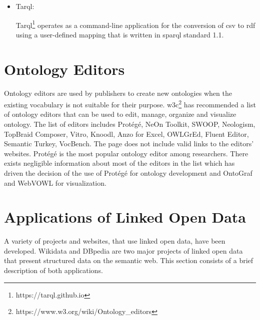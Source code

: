 \begin{doublespace}
\begin{itemize}
    \par XLWrap\footnote{https://xlwrap.sourceforge.io} is a graphical template based application that allows execution of various \ac{sparql} queries~\cite{andreas2009xlwrap}.  The spreadsheets are wrapped to arbitrary \ac{rdf} graphs which allows:
    \begin{itemize}
    	\item Streamed processing of tabluar data like Excel, OpenDocument and \ac{csv}
	\item Loading Local/\ac{http}
	\item Expressions that include calculator operations for Excel and OpenDocument, and Custom functions
	\item Use of \ac{api} and \ac{sparql} endpoint
    \end{itemize}
    \item Tarql:
    \par Tarql\footnote{https://tarql.github.io} operates as a command-line application for the conversion of \ac{csv} to \ac{rdf} using a user-defined mapping that is written in \ac{sparql} standard 1.1.
\end{itemize}
\section{Ontology Editors}
\par Ontology editors are used by publishers to create new ontologies when the existing vocabulary is not suitable for their purpose. \ac{w3c}\footnote{https://www.w3.org/wiki/Ontology\_editors} has recommended a list of ontology editors that can be used to edit, manage, organize and visualize ontology. The list of editors includes Protégé, NeOn Toolkit, SWOOP, Neologism, TopBraid Composer, Vitro, Knoodl, Anzo for Excel, OWLGrEd, Fluent Editor, Semantic Turkey, VocBench. The page does not include valid links to the editors' websites. Protégé is the most popular ontology editor among researchers. There exists negligible information about most of the editors in the list which has driven the decision of the use of Protégé for ontology development and OntoGraf and WebVOWL for visualization.
\section{Applications of Linked Open Data}
\par A variety of projects and websites, that use linked open data, have been developed. Wikidata and DBpedia are two major projects of linked open data that present structured data on the semantic web. This section consists of a brief description of both applications.

\end{doublespace}
